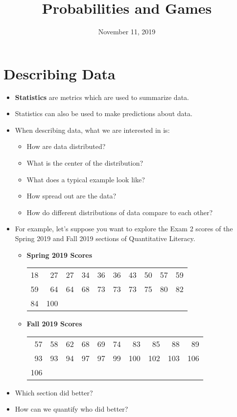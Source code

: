 \documentclass{article}
\title{Probabilities and Games}
\date{November 11, 2019}
\begin{document}
\maketitle

\section{Describing Data}
\begin{itemize}
    \item \textbf{Statistics} are metrics which are used to summarize data.
    \item Statistics can also be used to make predictions about data.
    \item When describing data, what we are interested in is:
    \begin{itemize}
        \item How are data distributed?
        \item What is the center of the distribution?
        \item What does a typical example look like?
        \item How spread out are the data?
        \item How do different distributions of data compare to each other?
    \end{itemize}
    \item For example, let's suppose you want to explore the Exam 2 scores of the 
        Spring 2019 and Fall 2019 sections of Quantitative Literacy.
        \begin{itemize}
            \item \textbf{Spring 2019 Scores}
            \newline\begin{tabular}{rrrrrrrrrr}
            18 & 27 & 27 & 34 & 36 & 36 & 43 & 50 & 57 & 59\\
            59 & 64 & 64 & 68 & 73 & 73 & 73 & 75 & 80 & 82\\
            84 & 100\\
            \end{tabular}

            \item \textbf{Fall 2019 Scores}
            \newline\begin{tabular}{rrrrrrrrrr}
            57 & 58 & 62 & 68 & 69 & 74 & 83 & 85 & 88 & 89 \\
            93 & 93 & 94 & 97 & 97 & 99 & 100 & 102 & 103 & 106\\
            106 \\
            \end{tabular}
        \end{itemize}
    \item Which section did better?
    \item How can we quantify who did better?
\end{itemize}
\end{document}
